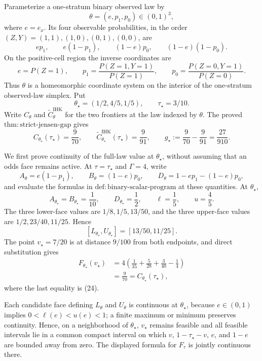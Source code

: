 Parameterize a one-stratum binary observed law by
\[
\theta=(e,p_1,p_0)\in(0,1)^3,
\]
where \(e=e_x\).  Its four observable probabilities, in the order \((Z,Y)=(1,1),(1,0),(0,1),(0,0)\), are
\[
ep_1,\qquad e(1-p_1),\qquad(1-e)p_0,\qquad(1-e)(1-p_0).
\tag{22}
\]
On the positive-cell region the inverse coordinates are
\[
e=P(Z=1),\qquad
p_1=\frac{P(Z=1,Y=1)}{P(Z=1)},\qquad
p_0=\frac{P(Z=0,Y=1)}{P(Z=0)}.
\tag{23}
\]
Thus \(\theta\) is a homeomorphic coordinate system on the interior of the one-stratum observed-law simplex.  Put
\[
\theta_\star=(1/2,4/5,1/5),
\qquad \tau_\star=3/10.
\]
Write \(C_\theta\) and \(\widetilde C^{\mathrm{IHK}}_\theta\) for the two frontiers at the law indexed by \(\theta\).  The proved \(\mathrm{thm{:}strict\mbox{-}jensen\mbox{-}gap}\) gives
\[
C_{\theta_\star}(\tau_\star)=\frac9{70},\qquad
\widetilde C^{\mathrm{IHK}}_{\theta_\star}(\tau_\star)=\frac9{91},\qquad
g_\star:=\frac9{70}-\frac9{91}=\frac{27}{910}.
\tag{24}
\]

We first prove continuity of the full-law value at \(\theta_\star\), without assuming that an odds face remains active.  At \(\tau=\tau_\star\) and \(\Gamma=4\), write
\[
A_\theta=e(1-p_1),\qquad
B_\theta=(1-e)p_0,
\qquad
D_\theta=1-ep_1-(1-e)p_0,
\]
and evaluate the formulas in \(\mathrm{def{:}binary\mbox{-}scalar\mbox{-}program}\) at these quantities.  At \(\theta_\star\),
\[
A_{\theta_\star}=B_{\theta_\star}=\frac1{10},
\qquad D_{\theta_\star}=\frac12,
\qquad \ell=\frac15,
\qquad u=\frac45.
\]
The three lower-face values are \(1/8,1/5,13/50\), and the three upper-face values are \(1/2,23/40,11/25\).  Hence
\[
[L_{\theta_\star},U_{\theta_\star}]=[13/50,11/25].
\tag{25}
\]
The point \(v_\star=7/20\) is at distance \(9/100\) from both endpoints, and direct substitution gives
\[
\begin{aligned}
F_{\theta_\star}(v_\star)
&=4\left(\frac1{35}+\frac5{28}+\frac3{40}-\frac14\right)\\
&=\frac9{70}=C_{\theta_\star}(\tau_\star),
\end{aligned}
\tag{26}
\]
where the last equality is (24).

Each candidate face defining \(L_\theta\) and \(U_\theta\) is continuous at \(\theta_\star\), because \(e\in(0,1)\) implies \(0<\ell(e)<u(e)<1\); a finite maximum or minimum preserves continuity.  Hence, on a neighborhood of \(\theta_\star\), \(v_\star\) remains feasible and all feasible intervals lie in a common compact interval on which \(v\), \(1-\tau_\star-v\), \(e\), and \(1-e\) are bounded away from zero.  The displayed formula for \(F_\tau\) is jointly continuous there.

